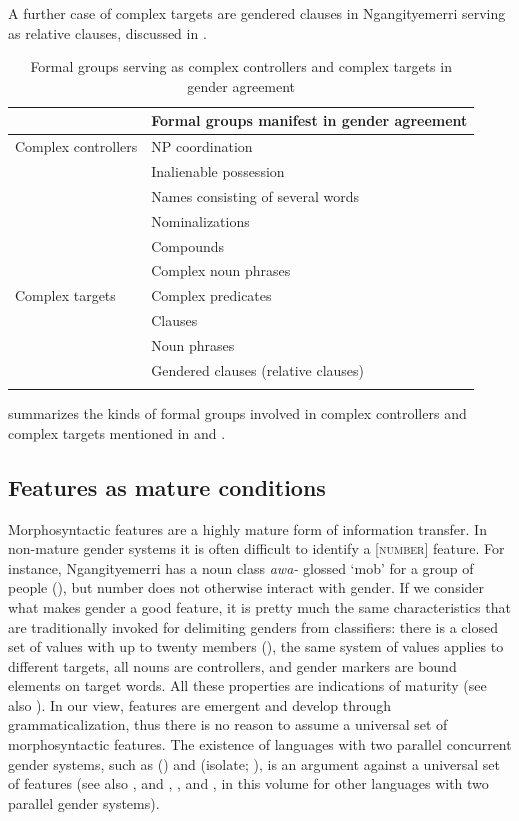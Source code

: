 \documentclass[output=collectionpaper]{langsci/langscibook}
\begin{document}
A further case of complex targets are gendered clauses in Ngan\textquotesingle{}gityemerri serving as relative clauses, discussed in .

\begin{table}[htb]
  \caption{Formal groups serving as complex controllers and complex targets in gender agreement}
\begin{tabular}{ll}
\lsptoprule
&	Formal groups manifest in gender agreement	\\
\midrule
Complex controllers	&	NP coordination	\\
&	Inalienable possession	\\
&	Names consisting of several words	\\
&	Nominalizations	\\
&	Compounds	\\
&	Complex noun phrases	\\
Complex targets	&	Complex predicates	\\
&	Clauses	\\
&	Noun phrases	\\
&	Gendered clauses (relative clauses)	\\
\lspbottomrule
\end{tabular}
\label{tab:WDG:16}
\end{table}

 summarizes the kinds of formal groups involved in complex controllers and complex targets mentioned in  and .

  \subsection{Features as mature conditions}
\label{sec:WDG:7.5}

Morphosyntactic features are a highly mature form of information transfer. In non-mature gender systems it is often difficult to identify a [\textsc{number}] feature. For instance, Ngan\textquotesingle{}gityemerri has a noun class \textit{awa-} glossed `mob' for a group of people (\citealt[296]{Reid1990}), but number does not otherwise interact with gender. If we consider what makes gender a good feature, it is pretty much the same characteristics that are traditionally invoked for delimiting genders from classifiers: there is a closed set of values with up to twenty members (\citealt[215]{Dixon1982}), the same system of values applies to different targets, all nouns are controllers, and gender markers are bound elements on target words. All these properties are indications of maturity (see also ). In our view, features are emergent and develop through grammaticalization, thus there is no reason to assume a universal set of morphosyntactic features. The existence of languages with two parallel concurrent gender systems, such as  (\citealt{Aikhenvald2010}) and  (isolate; \citealt{Donohue2001}), is an argument against a universal set of features (see also \citealt{Dahl2000}, \citealt[252]{Corbett2017} and \citealt{Svaerdthisyear}, \citealt{Liljegrenthisyear}, and \citealt{Sinnemaekithisyear}, in this volume for other languages with two parallel gender systems).
\end{document}
